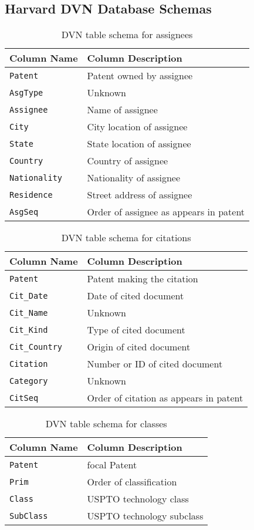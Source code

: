 \subsection*{Harvard DVN Database Schemas}

\begin{table}[ht]
\center
\begin{tabular}{| l | l |}
\hline
Column Name & Column Description \\
\hline
\verb`Patent` & Patent owned by assignee \\
\verb`AsgType` & Unknown \\
\verb`Assignee` & Name of assignee \\
\verb`City` & City location of assignee \\
\verb`State` & State location of assignee \\
\verb`Country` & Country of assignee \\
\verb`Nationality` & Nationality of assignee \\
\verb`Residence` & Street address of assignee \\
\verb`AsgSeq` & Order of assignee as appears in patent \\
\hline
\end{tabular}
\caption{DVN table schema for assignees}
\end{table}

\begin{table}[ht]
\center
\begin{tabular}{| l | l |}
\hline
Column Name & Column Description \\
\hline
\verb`Patent` & Patent making the citation \\
\verb`Cit_Date` & Date of cited document \\
\verb`Cit_Name` & Unknown \\
\verb`Cit_Kind` & Type of cited document \\
\verb`Cit_Country` & Origin of cited document \\
\verb`Citation` & Number or ID of cited document \\
\verb`Category` & Unknown \\
\verb`CitSeq` & Order of citation as appears in patent \\
\hline
\end{tabular}
\caption{DVN table schema for citations}
\end{table}

\begin{table}[ht]
\center
\begin{tabular}{| l | l |}
\hline
Column Name & Column Description \\
\hline
\verb`Patent` & focal Patent \\
\verb`Prim` & Order of classification \\
\verb`Class` & USPTO technology class \\
\verb`SubClass` & USPTO technology subclass \\
\hline
\end{tabular}
\caption{DVN table schema for classes}
\end{table}

